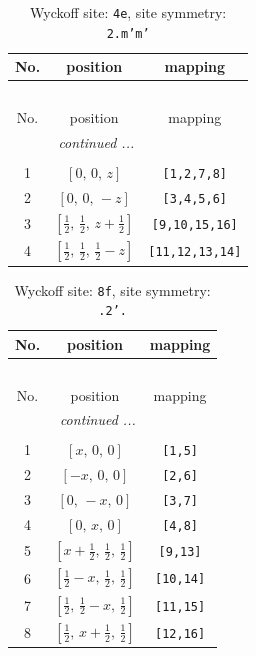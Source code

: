 \documentclass[fleqn,8pt]{jsarticle}
\begin{document}
\renewcommand{\arraystretch}{1.2}
\begin{longtable}{ccc}
\caption{Wyckoff site: {\tt 4e}, site symmetry: {\tt 2.m'm'}}
 \\
 \hline \hline
No. & position & mapping \\ \hline \endfirsthead

\multicolumn{2}{l}{\tablename\ \thetable{}} \\
 \hline \hline
No. & position & mapping \\ \hline \endhead

 \hline \hline
\multicolumn{2}{r}{\footnotesize\it continued ...} \\ \endfoot

 \hline \hline
\multicolumn{2}{r}{} \\ \endlastfoot

1 & $\left[ 0,\, 0,\, z \right]$ & {\tt [1,2,7,8]} \\ \hline
2 & $\left[ 0,\, 0,\, - z \right]$ & {\tt [3,4,5,6]} \\ \hline
3 & $\left[ \frac{1}{2},\, \frac{1}{2},\, z + \frac{1}{2} \right]$ & {\tt [9,10,15,16]} \\ \hline
4 & $\left[ \frac{1}{2},\, \frac{1}{2},\, \frac{1}{2} - z \right]$ & {\tt [11,12,13,14]} \\
\end{longtable}
\renewcommand{\arraystretch}{1.2}
\begin{longtable}{ccc}
\caption{Wyckoff site: {\tt 8f}, site symmetry: {\tt .2'.}}
 \\
 \hline \hline
No. & position & mapping \\ \hline \endfirsthead

\multicolumn{2}{l}{\tablename\ \thetable{}} \\
 \hline \hline
No. & position & mapping \\ \hline \endhead

 \hline \hline
\multicolumn{2}{r}{\footnotesize\it continued ...} \\ \endfoot

 \hline \hline
\multicolumn{2}{r}{} \\ \endlastfoot

1 & $\left[ x,\, 0,\, 0 \right]$ & {\tt [1,5]} \\ \hline
2 & $\left[ - x,\, 0,\, 0 \right]$ & {\tt [2,6]} \\ \hline
3 & $\left[ 0,\, - x,\, 0 \right]$ & {\tt [3,7]} \\ \hline
4 & $\left[ 0,\, x,\, 0 \right]$ & {\tt [4,8]} \\ \hline
5 & $\left[ x + \frac{1}{2},\, \frac{1}{2},\, \frac{1}{2} \right]$ & {\tt [9,13]} \\ \hline
6 & $\left[ \frac{1}{2} - x,\, \frac{1}{2},\, \frac{1}{2} \right]$ & {\tt [10,14]} \\ \hline
7 & $\left[ \frac{1}{2},\, \frac{1}{2} - x,\, \frac{1}{2} \right]$ & {\tt [11,15]} \\ \hline
8 & $\left[ \frac{1}{2},\, x + \frac{1}{2},\, \frac{1}{2} \right]$ & {\tt [12,16]} \\
\end{longtable}
\end{document}
